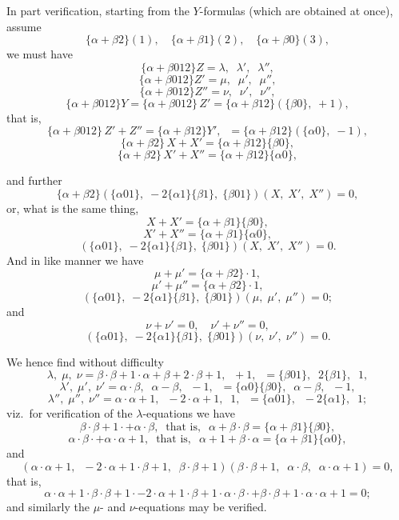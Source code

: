 \documentclass[11pt,a4paper]{article}
\begin{document}
In part verification, starting from the $Y$-formulas (which are obtained at once), assume
\[
\{\alpha + \beta 2\}(1),\quad \{\alpha + \beta 1\}(2),\quad \{\alpha + \beta 0\}(3),
\]
we must have
\[
\{\alpha + \beta 012\}Z = \lambda,\;\; \lambda',\;\; \lambda'',
\]
\[
\{\alpha + \beta 012\}Z' = \mu,\;\; \mu',\;\; \mu'',
\]
\[
\{\alpha + \beta 012\}Z'' = \nu,\;\; \nu',\;\; \nu'',
\]
\[
\{\alpha + \beta 012\}Y = \{\alpha + \beta 012\}\,Z' = \{\alpha + \beta 12\}(\{\beta 0\},\; +1),
\]
that is,
\[
\{\alpha + \beta 012\}\,Z' + Z'' = \{\alpha + \beta 12\}Y',\;\; = \{\alpha + \beta 12\}(\{\alpha 0\},\; -1),
\]
\[
\{\alpha + \beta 2\}\,X + X' = \{\alpha + \beta 12\}\{\beta 0\},
\]
\[
\{\alpha + \beta 2\}\,X' + X'' = \{\alpha + \beta 12\}\{\alpha 0\},
\]

\newpage


\noindent and further
\[
\{\alpha + \beta 2\}(\{\alpha 01\},\; -2\{\alpha 1\}\{\beta 1\},\; \{\beta 01\})(X,\; X',\; X'') = 0,
\]
or, what is the same thing,
\[
X + X' = \{\alpha + \beta 1\}\{\beta 0\},
\]
\[
X' + X'' = \{\alpha + \beta 1\}\{\alpha 0\},
\]
\[
(\{\alpha 01\},\; -2\{\alpha 1\}\{\beta 1\},\; \{\beta 01\})(X,\; X',\; X'') = 0.
\]
And in like manner we have
\[
\mu + \mu' = \{\alpha + \beta 2\}\cdot 1,
\]
\[
\mu' + \mu'' = \{\alpha + \beta 2\}\cdot 1,
\]
\[
(\{\alpha 01\},\; -2\{\alpha 1\}\{\beta 1\},\; \{\beta 01\})(\mu,\; \mu',\; \mu'') = 0;
\]
and
\[
\nu + \nu' = 0,\quad \nu' + \nu'' = 0,
\]
\[
(\{\alpha 01\},\; -2\{\alpha 1\}\{\beta 1\},\; \{\beta 01\})(\nu,\; \nu',\; \nu'') = 0.
\]

We hence find without difficulty
\[
\lambda,\;\mu,\;\nu = \beta\cdot \beta + 1\cdot \alpha + \beta + 2\cdot \beta + 1,\;\; +1,\;\; = \{\beta 01\},\;\; 2\{\beta 1\},\;\; 1,
\]
\[
\lambda',\;\mu',\;\nu' = \alpha\cdot \beta,\;\; \alpha - \beta,\;\; -1,\;\; = \{\alpha 0\}\{\beta 0\},\;\; \alpha - \beta,\;\; -1,
\]
\[
\lambda'',\;\mu'',\;\nu'' = \alpha\cdot \alpha + 1,\;\; -2\cdot \alpha + 1,\;\; 1,\;\; = \{\alpha 01\},\;\; -2\{\alpha 1\},\;\; 1;
\]
viz.\ for verification of the $\lambda$-equations we have
\[
\beta\cdot \beta + 1\cdot + \alpha\cdot \beta,\;\;\text{that is},\;\; \alpha + \beta\cdot \beta = \{\alpha + \beta 1\}\{\beta 0\},
\]
\[
\alpha\cdot \beta\cdot + \alpha\cdot \alpha + 1,\;\;\text{that is},\;\; \alpha + 1 + \beta\cdot \alpha = \{\alpha + \beta 1\}\{\alpha 0\},
\]
and
\[
(\alpha\cdot \alpha + 1,\;\; -2\cdot \alpha + 1\cdot \beta + 1,\;\; \beta\cdot \beta + 1)(\beta\cdot \beta + 1,\;\; \alpha\cdot \beta,\;\; \alpha\cdot \alpha + 1) = 0,
\]
that is,
\[
\alpha\cdot \alpha + 1\cdot \beta\cdot \beta + 1\cdot - 2\cdot \alpha + 1\cdot \beta + 1\cdot \alpha\cdot \beta\cdot + \beta\cdot \beta + 1\cdot \alpha\cdot \alpha + 1 = 0;
\]
and similarly the $\mu$- and $\nu$-equations may be verified.
\end{document}

